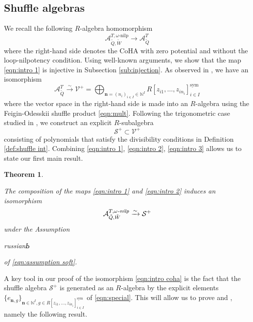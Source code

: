 \documentclass{amsart}
\newtheorem{theorem}{Theorem}[section]
\def\CS{{\mathcal{S}}}
\def\CV{{\mathcal{V}}}
\def\sym{\textrm{sym}}
\def\nn{{\mathbb{N}^I}}
\def\bn{{\boldsymbol{n}}}
\def\tQ{\tilde{Q}}
\def\tW{\tilde{W}}
\def\ring{R}
\def\soft{\begin{otherlanguage*}{russian}Ь \end{otherlanguage*}}
\def\kha{\mathcal{A}^{T,\omega\text{-nilp}}_{\tQ,\tW}}
\def\kzero{\mathcal{A}^{T}_{\tQ}}
\def\ekha{\mathcal{A}^{T,\omega\emph{-nilp}}_{\tQ,\tW}}
\begin{document}
\medskip
 
\subsection{Shuffle algebras} 
\label{sub:shuffle intro}

We recall the following $\ring$-algebra homomorphism
\begin{equation}
\label{eqn:intro 1}
\kha \rightarrow \kzero
\end{equation}
where the right-hand side denotes the CoHA with zero potential and without the loop-nilpotency condition. Using well-known arguments, we show that the map \eqref{eqn:intro 1} is injective in Subsection \ref{sub:injection}. As observed in \cite{KS}, we have an isomorphism
\begin{equation}
\label{eqn:intro 2}
\kzero \xrightarrow{\sim} \CV^+ = \bigoplus_{\bn = (n_i)_{i \in I} \in \nn} \ring[z_{i1},\dots,z_{in_i}]^{\sym}_{i \in I}
\end{equation}
where the vector space in the right-hand side is made into an $\ring$-algebra using the Feigin-Odesskii shuffle product \eqref{eqn:mult}. Following the trigonometric case studied in \cite{JNCoulomb}, we construct an explicit $\ring$-subalgebra
\begin{equation}
\label{eqn:intro 3}
\CS^+ \subset \CV^+
\end{equation}
consisting of polynomials that satisfy the divisibility conditions in Definition \ref{def:shuffle int}. Combining \eqref{eqn:intro 1}, \eqref{eqn:intro 2}, \eqref{eqn:intro 3} allows us to state our first main result.

\medskip 

\begin{theorem}
\label{thm:intro coha}

The composition of the maps \eqref{eqn:intro 1} and \eqref{eqn:intro 2} induces an isomorphism
\begin{equation}
\label{eqn:intro coha}
\ekha \xrightarrow{\sim} \CS^+
\end{equation}
under the Assumption \soft of \eqref{eqn:assumption soft}.

\end{theorem}

\medskip 

\noindent A key tool in our proof of the isomorphism \eqref{eqn:intro coha} is the fact that the shuffle algebra $\CS^+$ is generated as an $\ring$-algebra by the explicit elements $\{e_{\bn,g}\}_{\bn \in \nn, g \in \ring[z_{i1},\dots,z_{in_i}]_{i \in I}^{\sym}}$ of \eqref{eqn:special}. This will allow us to prove \cite[Conjecture 4.3]{jindalnegutbps} and \cite[Conjecture 2.12]{NGen}, namely the following result.
\end{document}
